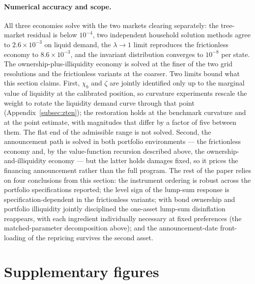 \documentclass[12pt]{article}
\begin{document}
\paragraph{Numerical accuracy and scope.} All three economies solve with
the two markets clearing separately: the tree-market residual is below
$10^{-4}$, two independent household solution methods agree to
$2.6\times10^{-3}$ on liquid demand, the $\lambda\to1$ limit reproduces
the frictionless economy to $8.6\times10^{-3}$, and the invariant
distribution converges to $10^{-8}$ per state. The
ownership-plus-illiquidity economy is solved at the finer of the two grid
resolutions and the frictionless variants at the coarser. Two limits
bound what this section claims. First, $\chi_b$ and $\zeta$ are jointly
identified only up to the marginal value of liquidity at the calibrated
position, so curvature experiments rescale the weight to rotate the
liquidity demand curve through that point
(Appendix~\ref{subsec:zten}); the restoration holds at the benchmark
curvature and at the point estimate, with magnitudes that differ by a factor
of five between them. The flat end of the admissible range is not solved. Second, the announcement path is solved in both portfolio
environments --- the frictionless economy and, by the value-function
recursion described above, the ownership-and-illiquidity economy --- but
the latter holds damages fixed, so it prices the financing announcement
rather than the full program.
The rest of the paper relies on four conclusions from this section: the instrument ordering
is robust across the portfolio specifications reported; the level sign of the
lump-sum response is specification-dependent in the frictionless variants;
with bond ownership and portfolio illiquidity jointly disciplined the
one-asset lump-sum disinflation reappears, with each ingredient
individually necessary at fixed preferences (the matched-parameter
decomposition above); and the announcement-date front-loading of the
repricing survives the second asset.



\section{Supplementary figures}\label{app:figures}
\end{document}
